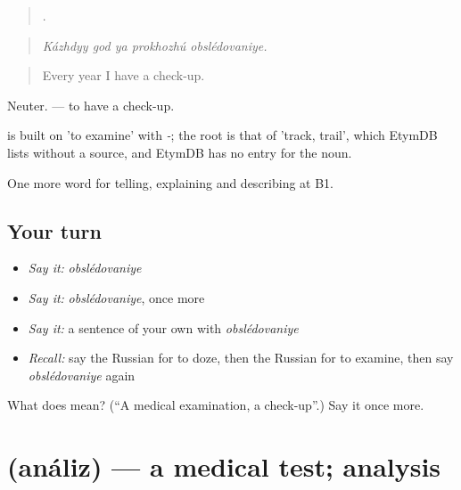 \begin{quote}
    .
\end{quote}

\begin{quote}
\emph{Kázhdyy god ya prokhozhú obslédovaniye.}
\end{quote}

\begin{quote}
Every year I have a check-up.
\end{quote}

Neuter. \emph{ } — to have a check-up.

\begin{cousinweb}
\emph{} is built on \emph{} 'to examine' with \emph{-}; the root is that of \emph{} 'track, trail', which EtymDB lists without a source, and EtymDB has no entry for the noun.
\end{cousinweb}

\begin{grammarlens}[title={What you've built}]
One more word for telling, explaining and describing at B1.
\end{grammarlens}

\subsection*{Your turn}
\begin{itemize}
\raggedright
  \item \emph{Say it:} \emph{obslédovaniye}
  \item \emph{Say it:} \emph{obslédovaniye}, once more
  \item \emph{Say it:} a sentence of your own with \emph{obslédovaniye}
  \item \emph{Recall:} say the Russian for to doze, then the Russian for to examine, then say \emph{obslédovaniye} again
\end{itemize}

\begin{tcolorbox}[breakable,colback=teal!4,colframe=teal!35!black,title={Before you move on}]
What does  mean? (\textquotedblleft{}A medical examination, a check-up\textquotedblright{}.) Say it once more.
\end{tcolorbox}
\section[\texorpdfstring{\ru{анализ} (análiz)}{анализ (análiz)}]{ (análiz) — a medical test; analysis}

